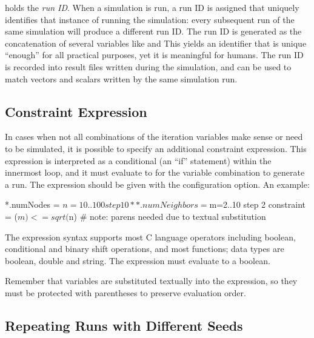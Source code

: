  holds the \textit{run ID}. When a simulation is run, a
run ID is assigned that uniquely identifies that instance of running the
simulation: every subsequent run of the same simulation will produce a different
run ID. The run ID is generated as the concatenation of several variables like
   and
 This yields an identifier that is unique “enough”
for all practical purposes, yet it is meaningful for humans. The run ID is
recorded into result files written during the simulation, and can be used
to match vectors and scalars written by the same simulation run.


\subsection{Constraint Expression}
\label{sec:config-sim:constraint-expression}

In cases when not all combinations of the iteration variables make sense
or need to be simulated, it is possible to specify an additional
constraint expression. This expression is interpreted as a conditional
(an “if” statement) within the innermost
loop, and it must evaluate to  for
the variable combination to generate a run. The expression should be
given with the  configuration option. An example:

\begin{inifile}
*.numNodes = ${n=10..100 step 10}
**.numNeighbors = ${m=2..10 step 2}
constraint = ($m) <= sqrt($n)  # note: parens needed due to textual substitution
\end{inifile}

The expression syntax supports most C language operators including boolean,
conditional and binary shift operations, and most  functions;
data types are boolean, double and string. The expression must evaluate to
a boolean.

\begin{note}
Remember that variables are substituted textually into the expression, so
they must be protected with parentheses to preserve evaluation order.
\end{note}


\subsection{Repeating Runs with Different Seeds}
\label{sec:config-sim:repeating-runs-with-different-seeds}

